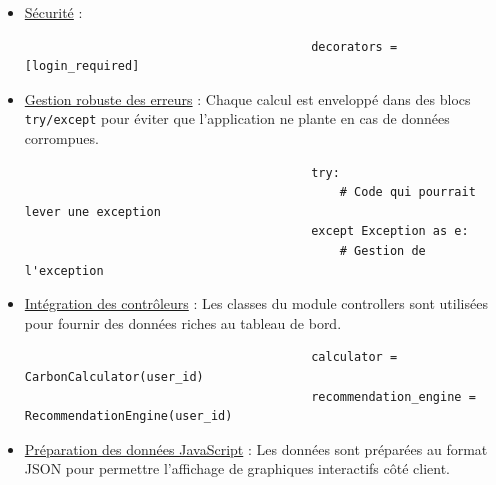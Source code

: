 \documentclass[a4paper,11pt]{article}
\begin{document}
\begin{enumerate}
                        \begin{itemize}
                            \item \underline{Sécurité} : 
                                \begin{tcolorbox}[colback=lightgray!6, colframe=black, left=-60mm, right=5mm, top=2mm, bottom=0mm, boxrule=0.1mm]
                                    \begin{verbatim}
                                        decorators = [login_required]
                                    \end{verbatim}
                                \end{tcolorbox}
                            \item \underline{Gestion robuste des erreurs} : Chaque calcul est enveloppé dans des blocs \texttt{try/except} pour éviter que l'application ne plante en cas de données corrompues.
                                \begin{tcolorbox}[colback=lightgray!6, colframe=black, left=-60mm, right=5mm, top=2mm, bottom=0mm, boxrule=0.1mm]
                                    \begin{verbatim}
                                        try:
                                            # Code qui pourrait lever une exception
                                        except Exception as e:
                                            # Gestion de l'exception
                                    \end{verbatim}
                                \end{tcolorbox}
                            \item \underline{Intégration des contrôleurs} : Les classes du module controllers sont utilisées pour fournir des données riches au tableau de bord.
                                \begin{tcolorbox}[colback=lightgray!6, colframe=black, left=-60mm, right=5mm, top=2mm, bottom=0mm, boxrule=0.1mm]
                                    \begin{verbatim}
                                        calculator = CarbonCalculator(user_id)
                                        recommendation_engine = RecommendationEngine(user_id)
                                    \end{verbatim}
                                \end{tcolorbox}
                            \item \underline{Préparation des données JavaScript} : Les données sont préparées au format JSON pour permettre l'affichage de graphiques interactifs côté client.

\end{itemize}
\end{enumerate}
\end{document}
